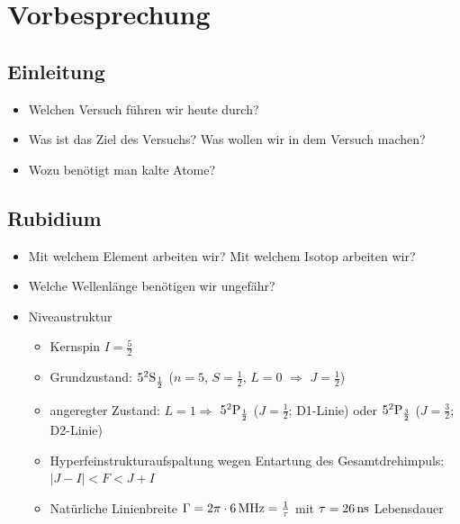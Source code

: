 \documentclass[10pt,a4paper]{extarticle}
\begin{document}
\section*{Vorbesprechung}

\subsection*{Einleitung}
\begin{itemize}
\item Welchen Versuch führen wir heute durch?
\item Was ist das Ziel des Versuchs? Was wollen wir in dem Versuch machen?
\item Wozu benötigt man kalte Atome?
\end{itemize}

\subsection*{Rubidium}
\begin{itemize}
\item Mit welchem Element arbeiten wir? Mit welchem Isotop arbeiten wir? 
\item Welche Wellenlänge benötigen wir ungefähr? 
\item Niveaustruktur 
\begin{itemize}
\item Kernspin $I=\frac{5}{2}$ 
\item Grundzustand: $5^2\rm{S}_{\frac{1}{2}}$ ($n=5$, $S=\frac{1}{2}$, $L=0$ $\Rightarrow$ $J=\frac{1}{2}$) 
\item angeregter Zustand: $L=1 \Rightarrow$ $5^2\rm{P}_{\frac{1}{2}}$ ($J=\frac{1}{2}$; D1-Linie) oder $5^2\rm{P}_{\frac{3}{2}}$ ($J=\frac{3}{2}$; D2-Linie) 
\item Hyperfeinstrukturaufspaltung wegen Entartung des Gesamtdrehimpuls: $|J-I|<F<J+I$ 
\item Natürliche Linienbreite  $\Gamma=2\pi\cdot\unit[6]{MHz} =\frac{1}{\tau}$ mit $\tau=\unit[26]{ns}$ Lebensdauer
\end{itemize}
\end{itemize}
\end{document}
